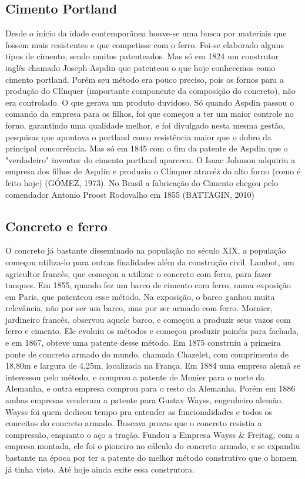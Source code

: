 \subsection{Cimento Portland}

Desde o início da idade contemporânea houve-se uma busca por materiais que fossem mais resistentes e que competisse com o ferro. Foi-se elaborado alguns tipos de cimento, sendo muitos patenteados. Mas só em 1824 um construtor inglês chamado Joseph Aspdin que patenteou o que hoje conhecemos como cimento portland. Porém seu método era pouco preciso, pois os fornos para a produção do Clínquer (importante componente da composição do concreto), não era controlado. O que gerava um produto duvidoso. Só quando Aspdin passou o comando da empresa para os filhos, foi que começou a ter um maior controle no forno, garantindo uma qualidade melhor, e foi divulgado nesta mesma gestão, pesquisas que apontava o portland como resistência maior que o dobro da principal concorrência. Mas só em 1845 com o fim da patente de Aspdin que o "verdadeiro" inventor do cimento portland apareceu. O Isaac Johnson adquiriu a empresa dos filhos de Aspdin e produziu o Clínquer atravéz do alto forno (como é feito hoje) (GÓMEZ, 1973).
No Brasil a fabricação do Cimento chegou pelo comendador Antonio Proost Rodovalho em 1855 (BATTAGIN, 2010)

\subsection{Concreto e ferro}

O concreto já bastante disseminado na população no século XIX, a população começou utiliza-lo para outras finalidades além da construção civil. Lambot, um agricultor francês, que começou a utilizar o concreto com ferro, para fazer tanques. Em 1855, quando fez um barco de cimento com ferro, numa exposição em Paris, que patenteou esse método. Na exposição, o barco ganhou muita relevância, não por ser um barco, mas por ser armado com ferro. Mornier, jardineiro francês, observou aquele barco, e começou a produzir seus vazos com ferro e cimento. Ele evoluiu os métodos e começou produzir painéis para fachada, e em 1867, obteve uma patente desse método. Em 1875 construiu a primeira ponte de concreto armado do mundo, chamada Chazelet, com comprimento de 18,80m e largura de 4,25m, localizada na França.
Em 1884 uma empresa alemã se interessou pelo método, e comprou a patente de Monier para o norte da Alemanha, e outra empresa comprou para o resto da Alemanha. Porém em 1886 ambas empresas venderam a patente para Gustav Wayss, engenheiro alemão. Wayss foi quem dedicou tempo pra entender as funcionalidades e todos os conceitos do concreto armado. Buscava provas que o concreto resistia a compressão, enquanto o aço a tração. Fundou a Empresa Wayss & Freitag, com a empresa montada, ele foi o pioneiro no cálculo do concreto armado, e se expandiu bastante na época por ter a patente do melhor método construtivo que o homem já tinha visto. Até hoje ainda exite essa construtora.

